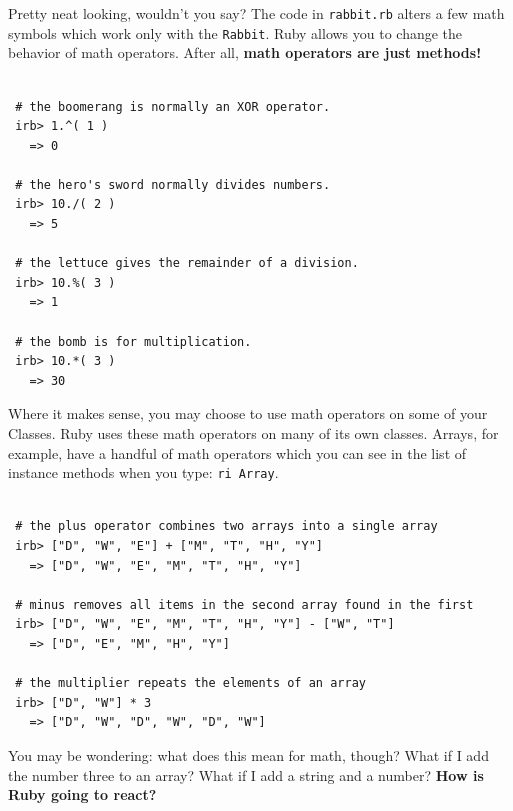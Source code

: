 \documentclass[10pt,twoside]{report}
\begin{document}
Pretty neat looking, wouldn't you say?  The code in
\lstinline[breaklines=true]|rabbit.rb| alters a few math symbols which
work only with the \lstinline[breaklines=true]|Rabbit|.  Ruby allows
you to change the behavior of math operators.  After all, {\bf math
  operators are just methods!}


\begin{lstlisting}

 # the boomerang is normally an XOR operator.
 irb> 1.^( 1 )
   => 0

 # the hero's sword normally divides numbers.
 irb> 10./( 2 )
   => 5

 # the lettuce gives the remainder of a division.
 irb> 10.%( 3 )
   => 1

 # the bomb is for multiplication.
 irb> 10.*( 3 )
   => 30

\end{lstlisting}


Where it makes sense, you may choose to use math operators on some of
your Classes.  Ruby uses these math operators on many of its own
classes.  Arrays, for example, have a handful of math operators which
you can see in the list of instance methods when you type:
\lstinline[breaklines=true]|ri Array|.


\begin{lstlisting}

 # the plus operator combines two arrays into a single array
 irb> ["D", "W", "E"] + ["M", "T", "H", "Y"]
   => ["D", "W", "E", "M", "T", "H", "Y"]

 # minus removes all items in the second array found in the first
 irb> ["D", "W", "E", "M", "T", "H", "Y"] - ["W", "T"]
   => ["D", "E", "M", "H", "Y"]

 # the multiplier repeats the elements of an array
 irb> ["D", "W"] * 3
   => ["D", "W", "D", "W", "D", "W"]

\end{lstlisting}


You may be wondering: what does this mean for math, though?  What if I
add the number three to an array?  What if I add a string and a
number?  {\bf How is Ruby going to react?}
\end{document}

